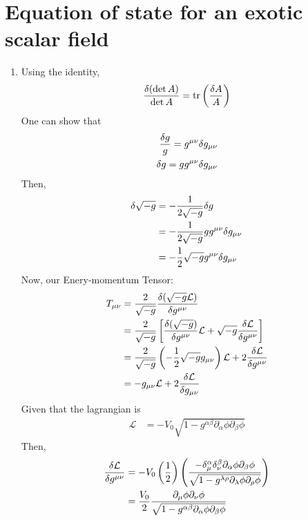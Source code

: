 \section{Equation of state for an exotic scalar field}
\newcommand{\Lagr}{\mathcal{L}}
\begin{enumerate}[label=(\alph*)]
	\item 
	Using the identity,
\begin{equation}
	\frac{\delta(\det A)}{\det A}  = \trace{\left(\frac{\delta A}{A}\right)}
\end{equation}
	One can show that 
\begin{align}
	\frac{\delta g}{g} = g^{\mu\nu} \delta g_{\mu\nu} \notag \\
	\delta g = g g^{\mu\nu} \delta g_{\mu\nu} 
\end{align}
Then,
\begin{align}
	\delta \sqrt{-g} &= -\frac{1}{2 \sqrt{-g}} \delta g \notag \\
				&= -\frac{1}{2 \sqrt{-g}} g g^{\mu\nu} \delta g_{\mu\nu} \notag  \\ 
				&= -\frac{1}{2} \sqrt{-g} g^{\mu\nu} \delta g_{\mu\nu} 
\end{align}
Now, our Enery-momentum Tensor:
\begin{align}
	T_{\mu\nu} 	&=  \frac{2}{\sqrt{-g}} \frac{\delta(\sqrt{-g}\mathcal{L})}{ \delta g^{\mu\nu}} \notag \\
				&= \frac{2}{\sqrt{-g}} \left[ \frac{\delta(\sqrt{-g})}{\delta g^{\mu\nu}} \mathcal{L}+ \sqrt{-g}\frac{\delta\mathcal{L}}{\delta g^{\mu\nu}}  \right]  \notag\\
				&= \frac{2}{\sqrt{-g}} \left( -\frac{1}{2} \sqrt{-g} g_{\mu\nu} \right) \mathcal{L} + 2\frac{\delta \mathcal{L}}{\delta g^{\mu\nu}}  \notag \\
				&= -g_{\mu\nu} \mathcal{L} + 2\frac{\delta\mathcal{L}}{\delta g_{\mu\nu}}  
\end{align}
Given that the lagrangian is \\
\begin{align}
		\Lagr &= -V_0 \sqrt{1-g^{\alpha\beta} \partial_\alpha \phi \partial_\beta \phi } 
\end{align}
Then,
\begin{align}
\frac{\delta\mathcal{L}}{\delta g^{\mu\nu}} &= -V_0 \left(\frac{1}{2}\right) \left( \frac{-\delta^\alpha_\mu \delta^\beta_\nu \partial_\alpha \phi \partial_\beta \phi}{\sqrt{1-g^{\lambda\rho} \partial_\lambda\phi \partial_\rho\phi }} \right) \notag \\
									&= \frac{V_0}{2} \frac{\partial_\mu \phi \partial_\nu \phi}{\sqrt{1-g^{\alpha\beta} \partial_\alpha \phi \partial_\beta \phi }}
\end{align}


\end{enumerate}
